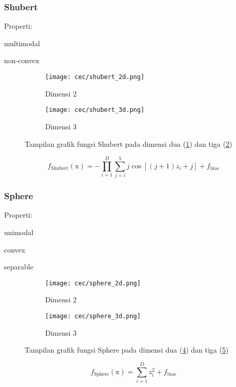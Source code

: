 \subsubsection{Shubert}
\noindent Properti:
\begin{packed_item}
  \item multimodal
  \item non-convex
\end{packed_item}
\begin{figure}[H]
	\centering
	\begin{subfigure}[b]{0.4\textwidth}
		\centering
		\texttt{[image: cec/shubert\_2d.png]}
		\caption{Dimensi 2}
		\label{fig:shubert-2d}
	\end{subfigure}
	\hfill
	\begin{subfigure}[b]{0.4\textwidth}
		\centering
		\texttt{[image: cec/shubert\_3d.png]}
		\caption{Dimensi 3}
		\label{fig:shubert-3d}
	\end{subfigure}
	\caption{Tampilan grafik fungsi Shubert pada dimensi dua (\cref{fig:shubert-2d}) dan tiga (\cref{fig:shubert-3d})}
	\label{fig:shubert}
\end{figure}
\begin{equation}
  f_{\text{Shubert}}(\mathrm{x})=-\prod_{i=1}^{D}\sum_{j=i}^{5}j\cos\left[\left(j+1 \right)z_i+j  \right]  +f_{\text{bias}}
\end{equation}

\subsubsection{Sphere}
\noindent Properti:
\begin{packed_item}
  \item unimodal
  \item convex
  \item separable
\end{packed_item}
\begin{figure}[H]
	\centering
	\begin{subfigure}[b]{0.4\textwidth}
		\centering
		\texttt{[image: cec/sphere\_2d.png]}
		\caption{Dimensi 2}
		\label{fig:sphere-2d}
	\end{subfigure}
	\hfill
	\begin{subfigure}[b]{0.4\textwidth}
		\centering
		\texttt{[image: cec/sphere\_3d.png]}
		\caption{Dimensi 3}
		\label{fig:sphere-3d}
	\end{subfigure}
	\caption{Tampilan grafik fungsi Sphere pada dimensi dua (\cref{fig:sphere-2d}) dan tiga (\cref{fig:sphere-3d})}
	\label{fig:sphere}
\end{figure}
\begin{equation}
  f_{\text{Sphere}}(\mathrm{x})=\sum_{i=1}^{D}z_i^2+f_{\text{bias}}
\end{equation}

